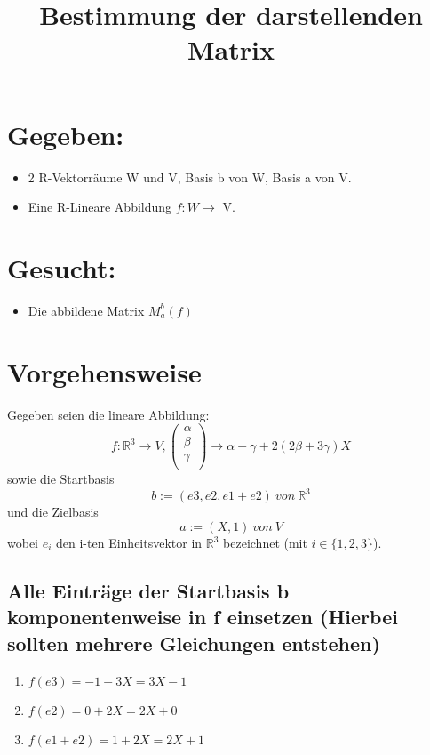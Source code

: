 \documentclass[12pt]{article}
\begin{document}
    \title{Bestimmung der darstellenden Matrix}
    \maketitle
    
    \section{Gegeben:}

    \begin{itemize}
        \item 2 R-Vektorräume W und V, Basis b von W, Basis a von V.
        \item Eine R-Lineare Abbildung $f: W\rightarrow$ V.
    \end{itemize}


    \section{Gesucht:}
    \begin{itemize}
        \item Die abbildene Matrix $M^{b}_a(f)$
    \end{itemize}
    \section{Vorgehensweise}
    Gegeben seien die lineare Abbildung:
    \[f:\mathbb{R}^3\rightarrow V, \begin{pmatrix}\alpha\\\beta\\\gamma\\\end{pmatrix} \rightarrow \alpha - \gamma + 2(2\beta + 3\gamma)X\]
    sowie die Startbasis \[b := (e3,e2,e1 +e2) \: von \:\mathbb{R}^3\]
    und die Zielbasis \[a := (X ,1) \:von\: V\]
    wobei $e_i$ den i-ten Einheitsvektor in $\mathbb{R}^3$ bezeichnet (mit $i\in\{1,2,3\}$).

    \subsection{Alle Einträge der Startbasis b komponentenweise in f einsetzen (Hierbei sollten mehrere Gleichungen entstehen)}

    \begin{enumerate}
        \item $f (e3) = -1 +3X=3X-1$
        \item $f (e2) = 0 +2X=2X+0$
        \item $f (e1 +e2) = 1 +2X=2X+1$
    \end{enumerate}
\end{document}
